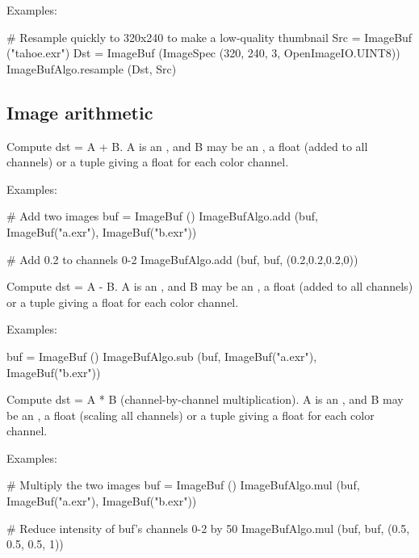 \smallskip
\noindent Examples:
\begin{code}
    # Resample quickly to 320x240 to make a low-quality thumbnail
    Src = ImageBuf ("tahoe.exr")
    Dst = ImageBuf (ImageSpec (320, 240, 3, OpenImageIO.UINT8))
    ImageBufAlgo.resample (Dst, Src)
\end{code}
\apiend



\subsection{Image arithmetic}
\label{sec:iba:py:arith}

 

Compute {\cf dst = A + B}.  {\cf A} is an \ImageBuf, and {\cf B}  may
be an \ImageBuf, a {\cf float} (added to all channels) or a tuple giving a
{\cf float} for each color channel.

\smallskip
\noindent Examples:
\begin{code}
    # Add two images
    buf = ImageBuf ()
    ImageBufAlgo.add (buf, ImageBuf("a.exr"), ImageBuf("b.exr"))

    # Add 0.2 to channels 0-2 
    ImageBufAlgo.add (buf, buf, (0.2,0.2,0.2,0))
\end{code}
\apiend


 

Compute {\cf dst = A - B}.  {\cf A} is an \ImageBuf, and {\cf B}  may
be an \ImageBuf, a {\cf float} (added to all channels) or a tuple giving a
{\cf float} for each color channel.

\smallskip
\noindent Examples:
\begin{code}
    buf = ImageBuf ()
    ImageBufAlgo.sub (buf, ImageBuf("a.exr"), ImageBuf("b.exr"))
\end{code}
\apiend


 

Compute {\cf dst} = {\cf A * B} (channel-by-channel multiplication).  {\cf A}
is an \ImageBuf, and {\cf B}  may be an \ImageBuf, a {\cf float} (scaling
all channels) or a tuple giving a {\cf float} for each color channel.

\smallskip
\noindent Examples:
\begin{code}
    # Multiply the two images
    buf = ImageBuf ()
    ImageBufAlgo.mul (buf, ImageBuf("a.exr"), ImageBuf("b.exr"))

    # Reduce intensity of buf's channels 0-2 by 50%
    ImageBufAlgo.mul (buf, buf, (0.5, 0.5, 0.5, 1))
\end{code}
\apiend


